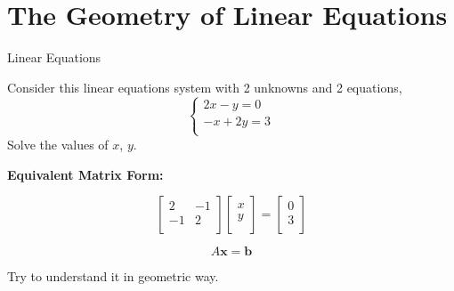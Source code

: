 \documentclass{beamer}
\begin{document}
\section{The Geometry of Linear Equations}
\begin{frame}{Linear Equations}


\begin{examples}
Consider this linear equations system with 2 unknowns and 2 equations,
\begin{equation*}
    \begin{cases}
	2x-y=0\\
	-x+2y=3\\
\end{cases}
\end{equation*}
Solve the values of $x$, $y$.
\end{examples}

\textbf{Equivalent Matrix Form:}

\begin{equation*}
    \left[ \begin{matrix}
	2&		-1\\
	-1&		2\\
\end{matrix} \right] \left[ \begin{array}{c}
	x\\
	y\\
\end{array} \right] =\left[ \begin{array}{c}
	0\\
	3\\
\end{array} \right]
\end{equation*}

\begin{equation*}
    A\mathbf{x}=\mathbf{b}
\end{equation*}

Try to understand it in geometric way.
\end{frame}
\end{document}
